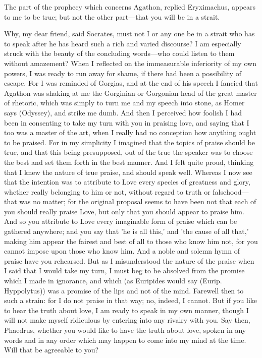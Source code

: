 \documentclass[11pt,letter]{article}
\begin{document}
\par  The part of the prophecy which concerns Agathon, replied Eryximachus, appears to me to be true; but not the other part—that you will be in a strait.

\par  Why, my dear friend, said Socrates, must not I or any one be in a strait who has to speak after he has heard such a rich and varied discourse? I am especially struck with the beauty of the concluding words—who could listen to them without amazement? When I reflected on the immeasurable inferiority of my own powers, I was ready to run away for shame, if there had been a possibility of escape. For I was reminded of Gorgias, and at the end of his speech I fancied that Agathon was shaking at me the Gorginian or Gorgonian head of the great master of rhetoric, which was simply to turn me and my speech into stone, as Homer says (Odyssey), and strike me dumb. And then I perceived how foolish I had been in consenting to take my turn with you in praising love, and saying that I too was a master of the art, when I really had no conception how anything ought to be praised. For in my simplicity I imagined that the topics of praise should be true, and that this being presupposed, out of the true the speaker was to choose the best and set them forth in the best manner. And I felt quite proud, thinking that I knew the nature of true praise, and should speak well. Whereas I now see that the intention was to attribute to Love every species of greatness and glory, whether really belonging to him or not, without regard to truth or falsehood—that was no matter; for the original proposal seems to have been not that each of you should really praise Love, but only that you should appear to praise him. And so you attribute to Love every imaginable form of praise which can be gathered anywhere; and you say that 'he is all this,' and 'the cause of all that,' making him appear the fairest and best of all to those who know him not, for you cannot impose upon those who know him. And a noble and solemn hymn of praise have you rehearsed. But as I misunderstood the nature of the praise when I said that I would take my turn, I must beg to be absolved from the promise which I made in ignorance, and which (as Euripides would say (Eurip. Hyppolytus)) was a promise of the lips and not of the mind. Farewell then to such a strain: for I do not praise in that way; no, indeed, I cannot. But if you like to hear the truth about love, I am ready to speak in my own manner, though I will not make myself ridiculous by entering into any rivalry with you. Say then, Phaedrus, whether you would like to have the truth about love, spoken in any words and in any order which may happen to come into my mind at the time. Will that be agreeable to you?
\end{document}
